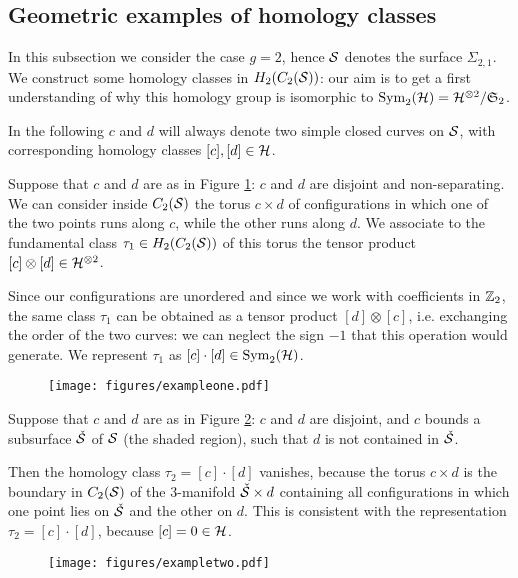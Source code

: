 \subsection{Geometric examples of homology classes}

In this subsection we consider the case $g=2$, hence $\S$ denotes the surface $\Sigma_{2,1}$.
We construct some homology classes in $H_2(C_2(\S))$: our aim is to get a first understanding
of why this homology group is isomorphic to $\Sym_2(\H)=\H^{\otimes 2}/\mathfrak{S}_2$.

In the following $c$ and $d$ will always denote two simple closed curves on $\S$, with corresponding homology classes $[c],[d]\in\H$.
\begin{ex}
 \label{ex:one}
Suppose that $c$ and $d$ are as in Figure \ref{fig:exampleone}: $c$ and $d$ are disjoint and non-separating.
We can consider inside $C_2(\S)$
the torus $c\times d$ of configurations in which one of the two points runs along $c$, while the other runs
along $d$. We associate to the fundamental class $\tau_1\in H_2(C_2(\S))$ of this torus the tensor product $[c]\otimes[d]\in\H^{\otimes 2}$.

Since our configurations are unordered and since we work with coefficients in $\Z_2$, the same
class $\tau_1$ can be obtained as a tensor product $[d]\otimes[c]$, i.e. exchanging the order of the two
curves: we can neglect the sign $-1$ that this operation would generate. We represent $\tau_1$ as $[c]\cdot[d]\in\Sym_2(\H)$.
\end{ex}
\begin{figure}[h]\centering
 \texttt{[image: figures/exampleone.pdf]}
 \caption{}
\label{fig:exampleone}
\end{figure}

\begin{ex}
 \label{ex:two}
Suppose that $c$ and $d$ are as in Figure \ref{fig:exampletwo}:
$c$ and $d$ are disjoint, and
 $c$ bounds a subsurface $\check{\S}$ of $\S$ (the shaded region), such that $d$ is not contained in $\check{\S}$.
 
 Then the homology class $\tau_2=[c]\cdot[d]$ vanishes, because the torus $c\times d$ is the boundary in $C_2(\S)$
 of the 3-manifold $\check{\S}\times d$ containing all configurations in which one point lies on $\check{\S}$ and
 the other on $d$. This is consistent with the representation $\tau_2=[c]\cdot[d]$, because $[c]=0\in \H$.
\end{ex}
\begin{figure}[h]\centering
 \texttt{[image: figures/exampletwo.pdf]}
 \caption{}
\label{fig:exampletwo}
\end{figure}

